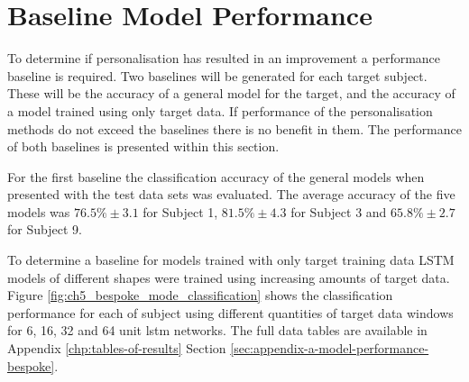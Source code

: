 \section{Baseline Model Performance}
\label{sec:personalisation-baseline-model-results}
To determine if personalisation has resulted in an improvement a performance baseline is required. Two baselines will be generated for each target subject. These will be the accuracy of a general model for the target, and the accuracy of a model trained using only target data. If performance of the personalisation methods do not exceed the baselines there is no benefit in them. The performance of both baselines is presented within this section.

For the first baseline the classification accuracy of the general models when presented with the test data sets was evaluated. The average accuracy of the five models was $76.5\%\pm3.1$ for Subject 1, $81.5\%\pm4.3$ for Subject 3 and $65.8\%\pm2.7$ for Subject 9.

To determine a baseline for models trained with only target training data LSTM models of different shapes were trained using increasing amounts of target data. Figure \ref{fig:ch5_bespoke_mode_classification} shows the classification performance for each of subject using different quantities of target data windows for 6, 16, 32 and 64 unit \acrshort{lstm} networks. The full data tables are available in Appendix \ref{chp:tables-of-results} Section \ref{sec:appendix-a-model-performance-bespoke}.


